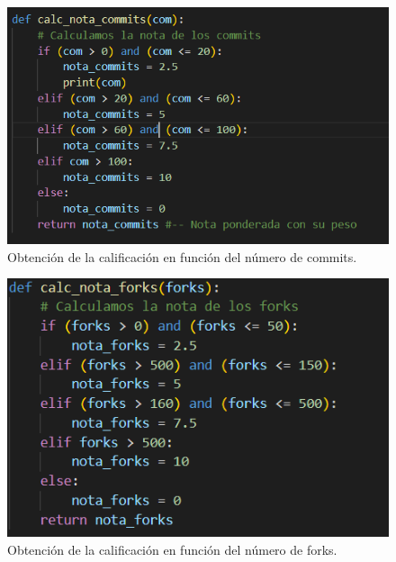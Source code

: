 \documentclass[a4paper, 12pt]{book}
\begin{document}
\begin{figure}
    \centering
    \includegraphics[width=1\textwidth, keepaspectratio]{img/nota_commits.png}
    \caption{Obtención de la calificación en función del número de commits.}\label{fig:nota_commits}
\end{figure}
\begin{figure}
    \centering
    \includegraphics[width=1\textwidth, keepaspectratio]{img/nota_forks.png}
    \caption{Obtención de la calificación en función del número de forks.}\label{fig:nota_forks}
\end{figure}
\end{document}
